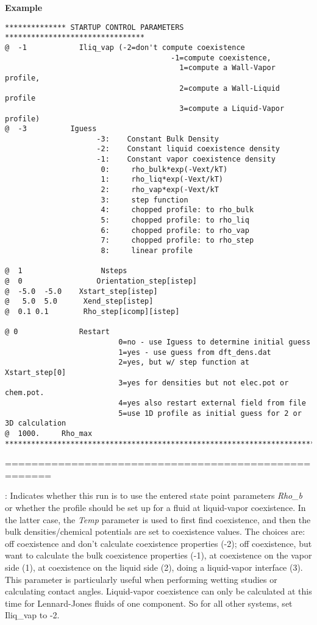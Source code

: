\documentclass[10pt,onecolumn]{article}
\begin{document}
{\bf Example}

\begin{verbatim}
************** STARTUP CONTROL PARAMETERS ********************************
@  -1            Iliq_vap (-2=don't compute coexistence 
                                      -1=compute coexistence,
                                        1=compute a Wall-Vapor profile, 
                                        2=compute a Wall-Liquid profile
                                        3=compute a Liquid-Vapor profile)
@  -3          Iguess
                     -3:    Constant Bulk Density
                     -2:    Constant liquid coexistence density
                     -1:    Constant vapor coexistence density
                      0:     rho_bulk*exp(-Vext/kT)
                      1:     rho_liq*exp(-Vext/kT)
                      2:     rho_vap*exp(-Vext/kT
                      3:     step function
                      4:     chopped profile: to rho_bulk
                      5:     chopped profile: to rho_liq
                      6:     chopped profile: to rho_vap
                      7:     chopped profile: to rho_step
                      8:     linear profile

@  1                  Nsteps
@  0                 Orientation_step[istep]
@  -5.0  -5.0    Xstart_step[istep]                      
@   5.0  5.0      Xend_step[istep]                      
@  0.1 0.1        Rho_step[icomp][istep]

@ 0              Restart 
                          0=no - use Iguess to determine initial guess 
                          1=yes - use guess from dft_dens.dat 
                          2=yes, but w/ step function at Xstart_step[0] 
                          3=yes for densities but not elec.pot or chem.pot.
                          4=yes also restart external field from file
                          5=use 1D profile as initial guess for 2 or 3D calculation
@  1000.     Rho_max   
***********************************************************************
\end{verbatim}

\noindent=====================================================
\vspace{0.1in}


\vspace{0.1in}
:
Indicates whether this run is to use the entered state point parameters
{\it Rho\_b} or whether the profile should be set up for a fluid
at liquid-vapor coexistence.  In the latter case, the {\it Temp}
parameter is used to first find coexistence, and then the
bulk densities/chemical potentials are set to coexistence values.
The choices are: off coexistence and don't calculate coexistence
properties (-2); off coexistence, but want to calculate
the bulk coexistence properties (-1), at coexistence on the vapor side
 (1), at coexistence on the liquid side (2), doing a liquid-vapor interface (3).
This parameter is particularly useful when performing wetting studies
or calculating contact angles. Liquid-vapor coexistence can only be
calculated at this time for Lennard-Jones fluids of one
component.  So for all other systems, set Iliq\_vap to -2.
\end{document}
